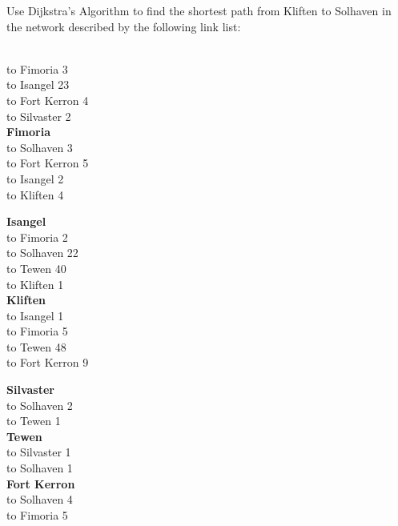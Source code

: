 
Use Dijkstra's Algorithm to find the shortest path from Kliften to Solhaven in the network described by the following link list:
\begin{center}
\vspace{-1mm}
\begin{minipage}[T]{0.90\textwidth}
\begin{minipage}[T]{0.32\textwidth}  
\vspace{-4mm}{\bf Solhaven}\\ 
to Fimoria 3\\
to Isangel 23\\
to Fort Kerron 4 \\
to Silvaster 2 \\
  
{\bf Fimoria\\}
to Solhaven 3 \\
to Fort Kerron 5 \\
to Isangel 2 \\
to Kliften 4 
\end{minipage}
\begin{minipage}[T]{0.32\textwidth}  

{\bf Isangel\\}
to Fimoria 2 \\
to Solhaven 22 \\
to Tewen 40 \\
to Kliften 1 \\

{\bf Kliften\\}
to Isangel 1 \\
to Fimoria 5 \\
to Tewen 48 \\
to Fort Kerron 9 \\

\end{minipage}
\begin{minipage}[T]{0.32\textwidth}  
\vspace{-0mm}
{\bf Silvaster\\}
to Solhaven 2\\
to Tewen 1 \\

{\bf Tewen\\}
to Silvaster 1\\
to Solhaven 1\\

{\bf Fort Kerron\\}
to Solhaven 4 \\
to Fimoria 5 \\
\end{minipage}
\end{minipage}
\end{center}
\vspace{-1mm}

